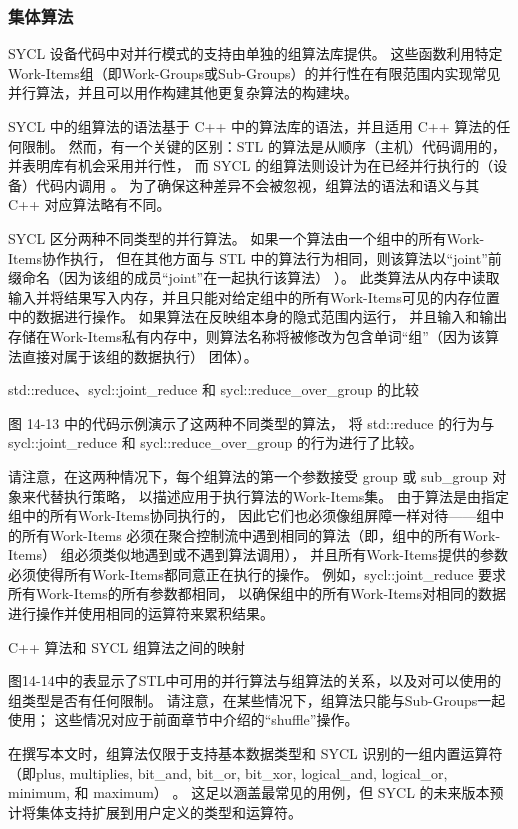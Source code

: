 \subsubsection{集体算法}
SYCL 设备代码中对并行模式的支持由单独的组算法库提供。 
这些函数利用特定Work-Items组（即Work-Groups或Sub-Groups）的并行性在有限范围内实现常见并行算法，并且可以用作构建其他更复杂算法的构建块。

SYCL 中的组算法的语法基于 C++ 中的算法库的语法，并且适用 C++ 算法的任何限制。 
然而，有一个关键的区别：STL 的算法是从顺序（主机）代码调用的，并表明库有机会采用并行性，
而 SYCL 的组算法则设计为在已经并行执行的（设备）代码内调用 。 
为了确保这种差异不会被忽视，组算法的语法和语义与其 C++ 对应算法略有不同。

SYCL 区分两种不同类型的并行算法。 如果一个算法由一个组中的所有Work-Items协作执行，
但在其他方面与 STL 中的算法行为相同，则该算法以“joint”前缀命名（因为该组的成员“joint”在一起执行该算法） ）。 
此类算法从内存中读取输入并将结果写入内存，并且只能对给定组中的所有Work-Items可见的内存位置中的数据进行操作。 
如果算法在反映组本身的隐式范围内运行，
并且输入和输出存储在Work-Items私有内存中，则算法名称将被修改为包含单词“组”（因为该算法直接对属于该组的数据执行） 团体）。

{\color{red} std::reduce、sycl::joint\_reduce 和 sycl::reduce\_over\_group 的比较}

图 14-13 中的代码示例演示了这两种不同类型的算法，
将 std::reduce 的行为与 sycl::joint\_reduce 和 sycl::reduce\_over\_group 的行为进行了比较。

请注意，在这两种情况下，每个组算法的第一个参数接受 group 或 sub\_group 对象来代替执行策略，
以描述应用于执行算法的Work-Items集。 
由于算法是由指定组中的所有Work-Items协同执行的，
因此它们也必须像组屏障一样对待——组中的所有Work-Items
必须在聚合控制流中遇到相同的算法（即，组中的所有Work-Items） 组必须类似地遇到或不遇到算法调用），
并且所有Work-Items提供的参数必须使得所有Work-Items都同意正在执行的操作。 
例如，sycl::joint\_reduce 要求所有Work-Items的所有参数都相同，
以确保组中的所有Work-Items对相同的数据进行操作并使用相同的运算符来累积结果。

{\color{red} C++ 算法和 SYCL 组算法之间的映射}

图14-14中的表显示了STL中可用的并行算法与组算法的关系，以及对可以使用的组类型是否有任何限制。 
请注意，在某些情况下，组算法只能与Sub-Groups一起使用； 这些情况对应于前面章节中介绍的“shuffle”操作。

在撰写本文时，组算法仅限于支持基本数据类型和 SYCL 识别的一组内置运算符
（即plus, multiplies, bit\_and, bit\_or, bit\_xor, logical\_and, logical\_or, minimum, 和 maximum） 。 
这足以涵盖最常见的用例，但 SYCL 的未来版本预计将集体支持扩展到用户定义的类型和运算符。

